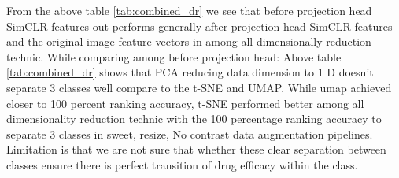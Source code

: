 From the above table \ref{tab:combined_dr} we see that before projection head SimCLR features out performs generally after projection head SimCLR features and the original image feature vectors in among all dimensionally reduction technic.
While comparing among before projection head: Above table \ref{tab:combined_dr}  shows that PCA reducing data dimension to 1 D doesn't separate 3 classes well compare to the t-SNE and UMAP. While umap achieved closer to 100 percent ranking accuracy, t-SNE performed better among all dimensionality reduction technic  with the 100 percentage ranking accuracy to separate 3 classes in sweet, resize, No contrast data augmentation pipelines. Limitation is that we are not sure that whether these clear separation between classes ensure there is perfect transition of drug efficacy within the class.